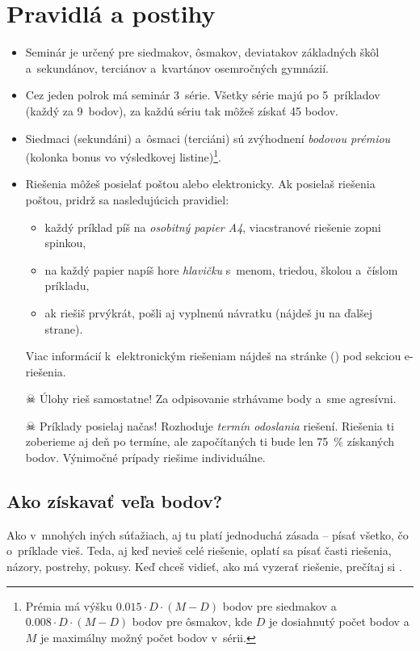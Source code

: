 \pagestyle{rules}

\section{Pravidlá a postihy}
\begin{itemize}
	\item Seminár je určený pre siedmakov, ôsmakov, deviatakov základných škôl a~sekundánov, terciánov a~kvartánov osemročných gymnázií. 

	\item Cez jeden polrok má seminár 3~série. Všetky série majú po 5~príkladov (každý za 9~bodov), za každú sériu tak môžeš získať 45 bodov.

	\item Siedmaci (sekundáni) a~ôsmaci (terciáni) sú zvýhodnení \emph{bodovou prémiou} (kolonka bonus vo výsledkovej listine)\footnote{%
		Prémia má výšku $\num{0.015} \cdot D \cdot (M - D)$ bodov pre siedmakov a $\num{0.008} \cdot D \cdot (M - D)$ bodov pre ôsmakov,
		kde $D$ je dosiahnutý počet bodov a $M$ je maximálny možný počet bodov v~sérii.}.

	\item Riešenia môžeš posielať poštou alebo elektronicky. Ak posielaš riešenia poštou, pridrž sa nasledujúcich pravidiel:
		\begin{itemize}
			\item každý príklad píš na \emph{osobitný papier A4}, viacstranové riešenie zopni spinkou,
			\item na každý papier napíš hore \emph{hlavičku} s~menom, triedou, školou a~číslom príkladu,
			\item ak riešiš prvýkrát, pošli aj vyplnenú návratku (nájdeš ju na ďalšej strane).
		\end{itemize}
	Viac informácií k~elektronickým riešeniam nájdeš na stránke (\URL{\seminarURL}) pod sekciou e-riešenia.

	\item[$\skull$] Úlohy rieš samostatne! Za odpisovanie strhávame body a~sme agresívni. 

	\item[$\skull$] Príklady posielaj načas! Rozhoduje \emph{termín odoslania} riešení. Riešenia ti zoberieme aj deň po termíne, ale započítaných ti bude len \SI{75}{\percent} získaných bodov.
		Výnimočné prípady riešime individuálne.
\end{itemize}

\subsection{Ako získavať veľa bodov?}
	Ako v~mnohých iných súťažiach, aj tu platí jednoduchá zásada -- písať všetko, čo o~príklade vieš. Teda, aj keď nevieš celé riešenie, oplatí sa písať časti
    riešenia, názory, postrehy, pokusy. Keď chceš vidieť, ako má vyzerať riešenie, prečítaj si . 

